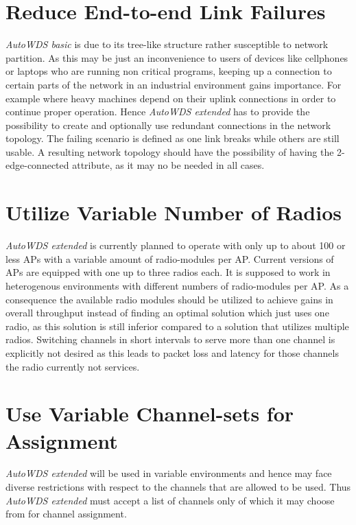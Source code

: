   \section{Reduce End-to-end Link Failures}
    \label{regendtoend}
    \textit{AutoWDS basic} is due to its tree-like structure rather susceptible to network partition.
    As this may be just an inconvenience to users of devices like cellphones or laptops who are running non critical programs, 
    keeping up a connection to certain parts of the network in an industrial environment gains importance.
    For example where heavy machines depend on their uplink connections in order to continue proper operation.
    Hence \textit{AutoWDS extended} has to provide the possibility to create and optionally use redundant connections in the network topology.
    The failing scenario is defined as one link breaks while others are still usable.
    A resulting network topology should have the possibility of having the 2-edge-connected attribute, as it may no be needed in all cases.
  
  \section{Utilize Variable Number of Radios}
    \label{utilvarnumradio}
    \textit{AutoWDS extended} is currently planned to operate with only up to about 100 or less APs with a variable amount of radio-modules per \ac{AP}.
    Current versions of APs are equipped with one up to three radios each.
    It is supposed to work in heterogenous environments with different numbers of radio-modules per \ac{AP}.
    As a consequence the available radio modules should be utilized to achieve gains in overall throughput instead of finding an optimal solution which just uses one radio,
    as this solution is still inferior compared to a solution that utilizes multiple radios.
    Switching channels in short intervals to serve more than one channel is explicitly not desired as this leads to packet loss and latency for those channels the radio
    currently not services.
  
  \section{Use Variable Channel-sets for Assignment}
    \textit{AutoWDS extended} will be used in variable environments and hence may face diverse restrictions with respect to the channels that are allowed to be used.
    Thus \textit{AutoWDS extended} must accept a list of channels only of which it may choose from for channel assignment.
  
